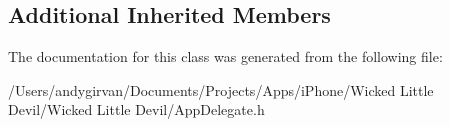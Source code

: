 \subsection*{Additional Inherited Members}


The documentation for this class was generated from the following file\-:\begin{DoxyCompactItemize}
\item 
/\-Users/andygirvan/\-Documents/\-Projects/\-Apps/i\-Phone/\-Wicked Little Devil/\-Wicked Little Devil/App\-Delegate.\-h\end{DoxyCompactItemize}
